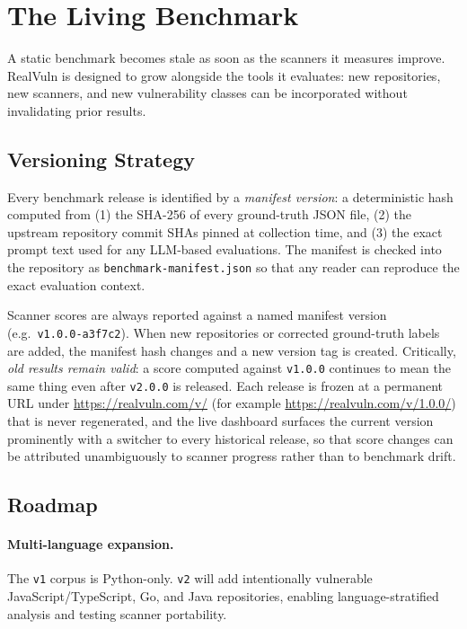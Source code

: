 \section{The Living Benchmark}

A static benchmark becomes stale as soon as the scanners it measures improve.
RealVuln is designed to grow alongside the tools it evaluates: new repositories,
new scanners, and new vulnerability classes can be incorporated without
invalidating prior results.

\subsection{Versioning Strategy}

Every benchmark release is identified by a \emph{manifest version}: a
deterministic hash computed from (1) the SHA-256 of every ground-truth JSON
file, (2) the upstream repository commit SHAs pinned at collection time, and
(3) the exact prompt text used for any LLM-based evaluations.  The manifest is
checked into the repository as \texttt{benchmark-manifest.json} so that any
reader can reproduce the exact evaluation context.

Scanner scores are always reported against a named manifest version (e.g.\
\texttt{v1.0.0-a3f7c2}).  When new repositories or corrected ground-truth
labels are added, the manifest hash changes and a new version tag is created.
Critically, \emph{old results remain valid}: a score computed against
\texttt{v1.0.0} continues to mean the same thing even after \texttt{v2.0.0}
is released.  Each release is frozen at a permanent URL under
\url{https://realvuln.com/v/} (for example \url{https://realvuln.com/v/1.0.0/})
that is never regenerated, and the live dashboard surfaces the current version
prominently with a switcher to every historical release, so that score changes
can be attributed unambiguously to scanner progress rather than to benchmark
drift.

\subsection{Roadmap}

\paragraph{Multi-language expansion.}
The \texttt{v1} corpus is Python-only.  \texttt{v2} will add intentionally
vulnerable JavaScript/TypeScript, Go, and Java repositories, enabling
language-stratified analysis and testing scanner portability.

